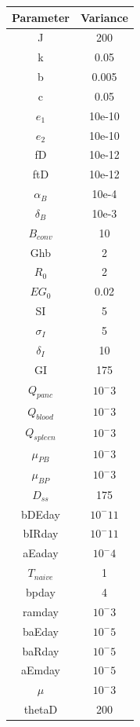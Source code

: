 \begin{table}[H]
  \begin{center}
    \begin{tabular}{c|c} %
      \textbf{Parameter} & \textbf{Variance} \\
      \hline
      J & 200\\
      k & 0.05\\
      {b} & 0.005\\
      {c} & 0.05\\
      {$e_1$} & 10e-10\\
      {$e_2$} & 10e-10\\
      {fD} &10e-12\\
      {ftD} & 10e-12\\
      {$\alpha_B$} & 10e-4\\
      {$\delta_B$} & 10e-3\\
      {$B_{conv}$} & 10\\
      {Ghb} & 2\\
      {$R_0$} & 2\\
      {$EG_0$} & 0.02\\
      {SI} & 5\\
      {$\sigma_I$} & 5\\
      {$\delta_I$} & 10\\
      {GI} & 175\\
      {$Q_{panc}$} & $10^-3$\\
      {$Q_{blood}$} & $10^-3$\\
      {$Q_{spleen}$} & $10^-3$\\
      {$\mu_{PB}$} & $10^-3$\\
      {$\mu_{BP}$} & $10^-3$\\
      {$D_{ss}$} & 175\\
      {bDEday} & $10^-11$\\
      {bIRday} & $10^-11$\\
      {aEaday} & $10^-4$\\
      {$T_{naive}$} & 1\\
      {bpday} & 4\\
      {ramday} & $10^-3$\\
      {baEday} & $10^-5$\\
      {baRday} & $10^-5$\\
      {aEmday} & $10^-5$\\
      {$\mu$} & $10^-3$\\
      {thetaD} & 200\\

\end{tabular}
\end{center}
\end{table}
